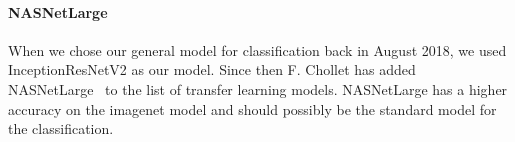 \paragraph{NASNetLarge}
When we chose our general model for classification back in August 2018, we used InceptionResNetV2 as our model. Since then F. Chollet has added NASNetLarge~\cite{DBLP:journals/corr/ZophVSL17} to the list of transfer learning models. NASNetLarge has a higher accuracy on the imagenet model and should possibly be the standard model for the classification.
